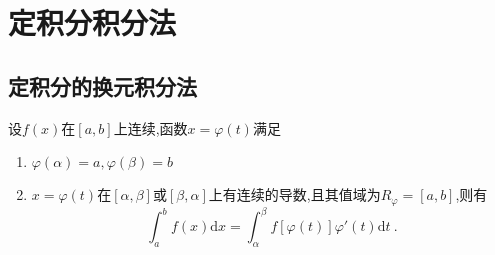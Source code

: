 \documentclass[8pt a4paper, oneside, UTF8]{ctexbook}  %
\begin{document}
\begin{sloppypar}
    \section{定积分积分法}
    \subsection{定积分的换元积分法}
    设$f(x)$在$[a,b]$上连续,函数$x=\varphi(t)$满足
    \begin{enumerate}
        \item $\varphi(\alpha)=a,\varphi(\beta)=b$
        \item $x=\varphi(t)$在$[\alpha,\beta]$或$[\beta,\alpha]$上有连续的导数,且其值域为$R_\varphi=[a,b]$,则有$$\int_{a}^{b}f(x)\mathrm{d}x=\int_{\alpha}^{\beta}f[\varphi(t)]\varphi'(t)\mathrm{d}t\:.$$
    \end{enumerate}

\end{sloppypar}
\end{document}
